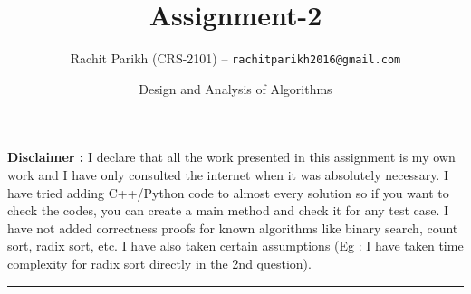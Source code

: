 \documentclass[14pt]{article}
\begin{document}
	
	\title{\color{blue}\Huge \textbf{Assignment-2}} 
	\date{\Large Design and Analysis of Algorithms}
	\author{Rachit Parikh (CRS-2101) -- \texttt{rachitparikh2016@gmail.com}}
	
	\maketitle
	\textbf{Disclaimer :} I declare that all the work presented in this assignment is my own work and I have only consulted the internet when it was absolutely necessary. I have tried adding C++/Python code to almost every solution so if you want to check the codes, you can create a main method and check it for any test case. I have not added correctness proofs for known algorithms like binary search, count sort, radix sort, etc. I have also taken certain assumptions (Eg : I have taken time complexity for radix sort directly in the 2nd question).
	
	\noindent
	\rule{\linewidth}{0.4pt}
	
\end{document}
